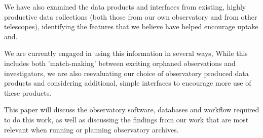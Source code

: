 \documentclass{report}
\begin{document}
We have also examined the data products and interfaces from existing,
highly productive data collections (both those from our own
observatory and from other telescopes), identifying the features that we
believe have helped encourage uptake and.


We are currently engaged in using this information in several ways,
While this includes both 'match-making' between exciting orphaned observations
and investigators, we are also reevaluating our choice of observatory
produced data products and considering additional, simple interfaces
to encourage more use of these products.


This paper will discuss the observatory software, databases and workflow required
to do this work, as well as discussing the findings from our work that
are most relevant when running or planning observatory archives.\newline
\newpage
\end{document}
